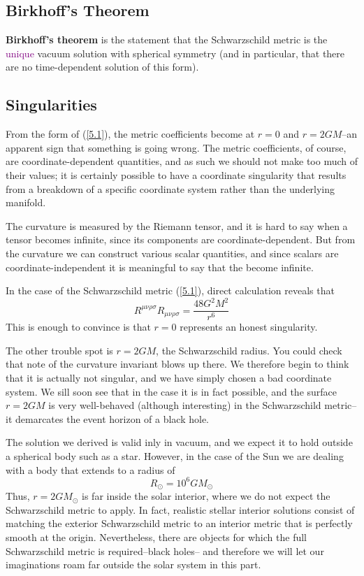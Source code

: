 \subsection{Birkhoff's Theorem}
\textbf{Birkhoff's theorem} is the statement that the Schwarzschild metric is the \textcolor{purple}{unique} vacuum solution with spherical symmetry (and in particular, that there are no time-dependent solution of this form).

\subsection{Singularities}
From the form of (\ref{5.1}), the metric coefficients become at $r=0$ and $r=2GM$--an apparent sign that something is going wrong. The metric coefficients, of course, are coordinate-dependent quantities, and as such we should not make too much of their values; it is certainly possible to have a coordinate singularity that results from a breakdown of a specific coordinate system rather than the underlying manifold.

The curvature is measured by the Riemann tensor, and it is hard to say when a tensor becomes infinite, since its components are coordinate-dependent. But from the curvature we can construct various scalar quantities, and since scalars are coordinate-independent it is meaningful to say that the become infinite.

In the case of the Schwarzschild metric (\ref{5.1}), direct calculation reveals that
\begin{equation*}
    R^{\mu\nu\rho\sigma}R_{\mu\nu\rho\sigma}=\frac{48G^2M^2}{r^6}
\end{equation*}
This is enough to convince is that $r=0$ represents an honest singularity.

The other trouble spot is $r=2GM$, the Schwarzschild radius. You could check that note of the curvature invariant blows up there. We therefore begin to think that it is actually not singular, and we have simply chosen a bad coordinate system. We sill soon see that in the case it is in fact possible, and the surface $r=2GM$ is very well-behaved (although interesting) in the Schwarzschild metric--it demarcates the event horizon of a black hole.

The solution we derived is valid inly in vacuum, and we expect it to hold outside a spherical body such as a star. However, in the case of the Sun we are dealing with a body that extends to a radius of
\begin{equation*}
    R_\odot=10^6GM_\odot
\end{equation*}
Thus, $r=2GM_\odot$ is far inside the solar interior, where we do not expect the Schwarzschild metric to apply. In fact, realistic stellar interior solutions consist of matching the exterior Schwarzschild metric to an interior metric that is perfectly smooth at the origin. Nevertheless, there are objects for which the full Schwarzschild metric is required--black holes-- and therefore we will let our imaginations roam far outside the solar system in this part.
